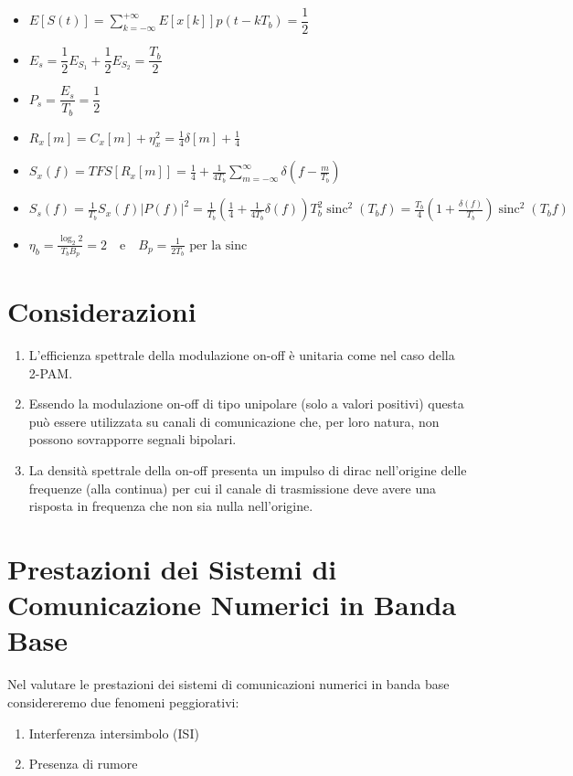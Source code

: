 \documentclass{article}
\begin{document}
\begin{itemize}
    \item $
E[S(t)] = \sum_{k=-\infty}^{+\infty} E[x[k]] p(t-kT_b) = \dfrac{1}{2}$
\item $
E_s = \dfrac{1}{2}E_{S_1} + \dfrac{1}{2}E_{S_2} = \dfrac{T_b}{2}
$
\item 
$
P_s = \dfrac{E_s}{T_b} = \dfrac{1}{2}$
\item $R_x[m] = C_x[m] + {\eta}_x^2 = \frac{1}{4} {\delta}[m] + \frac{1}{4}$

\item $S_x(f) = TFS\left[ R_x[m] \right] = \frac{1}{4} + \frac{1}{4T_b} \sum_{m=-\infty}^{\infty} \delta\left(f - \frac{m}{T_b}\right)$
\item $S_s(f) = \frac{1}{T_b} S_x(f)|P(f)|^2 = \frac{1}{T_b} \left( \frac{1}{4} + \frac{1}{4T_b} \delta(f) \right) T_b^2 \operatorname{sinc}^2(T_b f) = \frac{T_b}{4} \left( 1 + \frac{\delta(f)}{T_b} \right)\operatorname{sinc}^2(T_b f)$

\item ${\eta}_b = \frac{\log_2{2}}{T_b B_p} = 2 \quad \text{e} \quad B_p = \frac{1}{2T_b} \text{ per la sinc}$
\end{itemize}



\section*{Considerazioni}
\begin{enumerate}
  \item L'efficienza spettrale della modulazione on-off è unitaria come nel caso della 2-PAM.
  \item Essendo la modulazione on-off di tipo unipolare (solo a valori positivi) questa può essere utilizzata su canali di comunicazione che, per loro natura, non possono sovrapporre segnali bipolari.
  \item La densità spettrale della on-off presenta un impulso di dirac nell'origine delle frequenze (alla continua) per cui il canale di trasmissione deve avere una risposta in frequenza che non sia nulla nell'origine.
\end{enumerate}



\section*{Prestazioni dei Sistemi di Comunicazione Numerici in Banda Base}
Nel valutare le prestazioni dei sistemi di comunicazioni numerici in banda base considereremo due fenomeni peggiorativi:
\begin{enumerate}
  \item Interferenza intersimbolo (ISI)
  \item Presenza di rumore
\end{enumerate}
\end{document}
